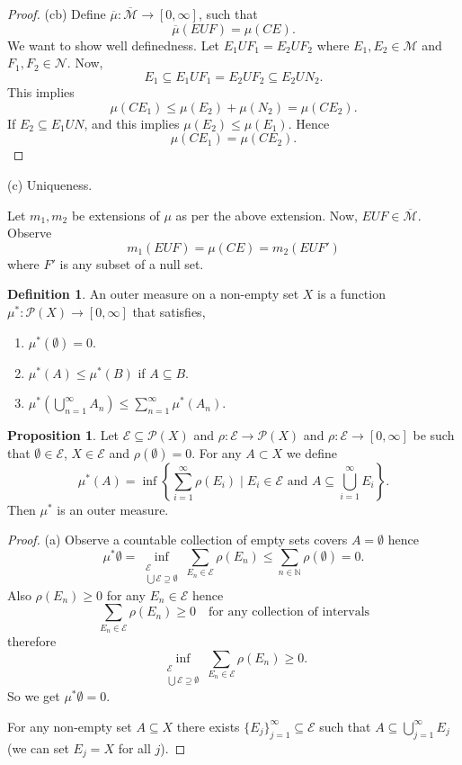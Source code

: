 \documentclass[11pt]{article}
\theoremstyle{definition}
\newtheorem{definition}{Definition}[section]
\newtheorem{proposition}{Proposition}[section]
\theoremstyle{remark}
\begin{document}
\begin{proof}
(cb) Define $\overline{\mu} : \overline{\mathcal{M}} \to [0, \infty]$, such that
\[
\overline{\mu}(EUF) = \mu(CE).
\]
We want to show well definedness. Let $E_1UF_1 = E_2UF_2$ where
$E_1, E_2 \in \mathcal{M}$ and $F_1, F_2 \in \mathcal{N}$. Now,
\[
E_1 \subseteq E_1UF_1 = E_2UF_2 \subseteq E_2UN_2.
\]
This implies
\[
\mu(CE_1) \leq \mu(E_2) + \mu(N_2) = \mu(CE_2).
\]
If $E_2 \subseteq E_1UN$, and this implies $\mu(E_2) \leq \mu(E_1)$. Hence
\[
\mu(CE_1) = \mu(CE_2).
\]
\end{proof}

(c) Uniqueness.

Let $m_1, m_2$ be extensions of $\mu$ as per the above extension. Now, $EUF \in \overline{\mathcal{M}}$. Observe
\[
m_1(EUF) = \mu(CE) = m_2(EUF')
\]
where $F'$ is any subset of a null set.

\begin{definition}\label{def:outer_measure}
An outer measure on a non-empty set $X$ is a function $\mu^* \colon \mathcal{P}(X) \to [0, \infty]$ that satisfies,
\begin{enumerate}
    \item $\mu^*(\emptyset) = 0$.
    \item $\mu^*(A) \leq \mu^*(B)$ if $A \subseteq B$.
    \item $\mu^*\left(\bigcup_{n=1}^\infty A_n\right) \leq \sum_{n=1}^\infty \mu^*(A_n)$.
\end{enumerate}
\end{definition}

\begin{proposition}\label{prop:outer_measure_construction}
Let $\mathcal{E} \subseteq \mathcal{P}(X)$ and $\rho \colon \mathcal{E} \to \mathcal{P}(X)$ and $\rho \colon \mathcal{E} \to [0, \infty]$ be such that $\emptyset \in \mathcal{E}$, $X \in \mathcal{E}$ and $\rho(\emptyset) = 0$. For any $A \subset X$ we define
\[
\mu^*(A) = \inf\left\{\sum_{i=1}^\infty \rho(E_i) \mid E_i \in \mathcal{E} \text{ and } A \subseteq \bigcup_{i=1}^\infty E_i\right\}.
\]
Then $\mu^*$ is an outer measure.
\end{proposition}

\begin{proof}
(a) Observe a countable collection of empty sets covers $A = \emptyset$ hence
\[
\mu^* \emptyset = \inf_{\substack{\mathcal{E} \\ \bigcup \mathcal{E} \supseteq \emptyset}} \sum_{E_n \in \mathcal{E}} \rho(E_n) \leq \sum_{n \in \mathbb{N}} \rho(\emptyset) = 0.
\]
Also $\rho(E_n) \geq 0$ for any $E_n \in \mathcal{E}$ hence
\[
\sum_{E_n \in \mathcal{E}} \rho(E_n) \geq 0 \quad \text{for any collection of intervals}
\]
therefore
\[
\inf_{\substack{\mathcal{E} \\ \bigcup \mathcal{E} \supseteq \emptyset}} \sum_{E_n \in \mathcal{E}} \rho(E_n) \geq 0.
\]
So we get $\mu^* \emptyset = 0$.

For any non-empty set $A \subseteq X$ there exists $\{E_j\}_{j=1}^\infty \subseteq \mathcal{E}$ such that $A \subseteq \bigcup_{j=1}^\infty E_j$ (we can set $E_j = X$ for all $j$).
\end{proof}
\end{document}
